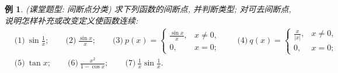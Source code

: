 \documentclass[UTF8,openany]{ctexbook}
\theoremstyle{chinesetextbook}
\newtheorem{example}{例}[section]
\begin{document}
\begin{example}
\textnormal{(课堂题型: 间断点分类)} 求下列函数的间断点, 并判断类型; 对可去间断点, 说明怎样补充或改变定义使函数连续:
\[
\begin{aligned}
&\text{(1)}\ \sin\frac1x;\qquad\text{(2)}\ \frac{\sin x}x;\qquad\text{(3)}\ p(x)=\begin{cases}\frac{\sin x}x,&x\ne0,\\0,&x=0;\end{cases}\qquad\text{(4)}\ q(x)=\begin{cases}\frac x{|x|},&x\ne0,\\0,&x=0;\end{cases}\\
&\text{(5)}\ \tan x;\qquad\text{(6)}\ \frac{x^2}{1-\cos x};\qquad\text{(7)}\ \frac1x\sin\frac1x.
\end{aligned}
\]
\end{example}
\end{document}
